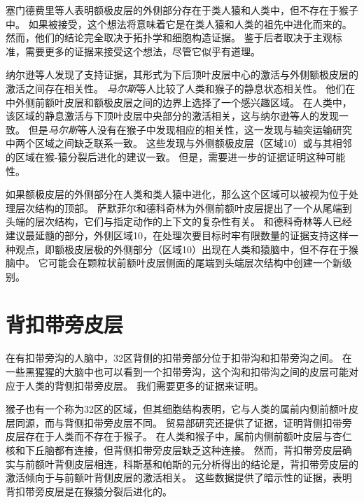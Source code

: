 塞门德费里等人\cite{semendeferi2001prefrontal}表明额极皮层的外侧部分存在于类人猿和人类中，但不存在于猴子中。
如果被接受，这个想法将意味着它是在类人猿和人类的祖先中进化而来的。
然而，他们的结论完全取决于拓扑学和细胞构造证据。
鉴于后者取决于主观标准，需要更多的证据来接受这个想法，尽管它似乎有道理。
\par


纳尔逊等人\cite{nelson2010parcellation}发现了支持证据，其形式为下后顶叶皮层中心的激活与外侧额极皮层的激活之间存在相关性。
\textit{马尔斯}等人\cite{mars2011diffusion}比较了人类和猴子的静息状态相关性。
他们在中外侧前额叶皮层和额极皮层之间的边界上选择了一个感兴趣区域。
在人类中，该区域的静息激活与下顶叶皮层中央部分的激活相关，这与纳尔逊等人的发现一致。
但是\textit{马尔斯}等人没有在猴子中发现相应的相关性，这一发现与轴突运输研究中两个区域之间缺乏联系一致。
这些发现与外侧额极皮层（区域10）或与其相邻的区域在猴-猿分裂后进化的建议一致。
但是，需要进一步的证据证明这种可能性。
\par


如果额极皮层的外侧部分在人类和类人猿中进化，那么这个区域可以被视为位于处理层次结构的顶部。
萨默菲尔和德科奇林为外侧前额叶皮层提出了一个从尾端到头端的层次结构，它们与指定动作的上下文的复杂性有关。
和德科奇林等人\cite{koechlin1999role}已经建议最延髓的部分，外侧区域10，在处理次要目标时牢有限数量的证据支持这样一种观点，即额极皮层极的外侧部分（区域10）出现在人类和猿脑中，但不存在于猴脑中。
它可能会在颗粒状前额叶皮层侧面的尾端到头端层次结构中创建一个新级别。



\section{背扣带旁皮层}

在有扣带旁沟的人脑中，32区背侧的扣带旁部分位于扣带沟和扣带旁沟之间\cite{ba2009architecture}。
在一些黑猩猩的大脑中也可以看到一个扣带旁沟，这个沟和扣带沟之间的皮层可能对应于人类的背侧扣带旁皮层。
我们需要更多的证据来证明。
\par


猴子也有一个称为32区\cite{ba2009architecture}的区域，但其细胞结构表明，它与人类的属前内侧前额叶皮层同源，而与背侧扣带旁皮层不同。
贸易部研究还提供了证据，证明背侧扣带旁皮层存在于人类而不存在于猴子。
在人类和猴子中，属前内侧前额叶皮层与杏仁核和下丘脑都有连接，但背侧扣带旁皮层缺乏这种连接\cite{beckmann2009connectivity}。
然而，背扣带旁皮层确实与前额叶背侧皮层相连，科斯基和帕斯\cite{koski2000functional}的元分析得出的结论是，背扣带旁皮层的激活倾向于与前额叶背侧皮层的激活相关。
这些数据提供了暗示性的证据，表明背扣带旁皮层是在猴猿分裂后进化的。



